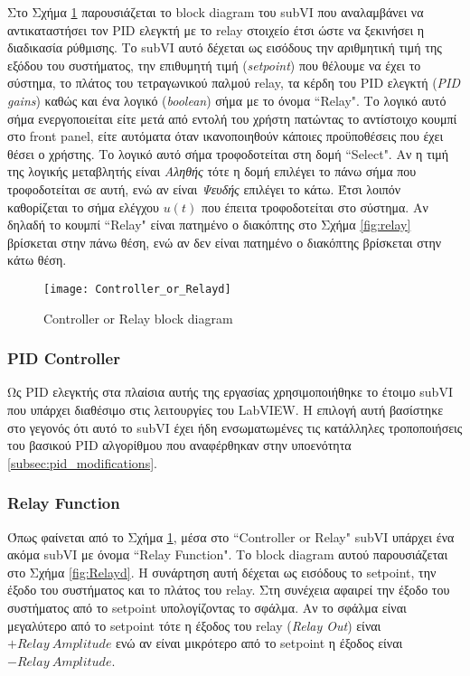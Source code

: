 Στο Σχήμα \ref{fig:Controller_or_Relayd} παρουσιάζεται το block diagram του subVI που αναλαμβάνει να αντικαταστήσει τον PID ελεγκτή με το relay στοιχείο έτσι ώστε να ξεκινήσει η διαδικασία ρύθμισης. Το subVI αυτό δέχεται ως εισόδους την αριθμητική τιμή της εξόδου του συστήματος, την επιθυμητή τιμή (\emph{setpoint}) που θέλουμε να έχει το σύστημα, το πλάτος του τετραγωνικού παλμού relay, τα κέρδη του PID ελεγκτή (\emph{PID gains}) καθώς και ένα λογικό (\emph{boolean}) σήμα με το όνομα ``Relay". Το λογικό αυτό σήμα ενεργοποιείται είτε μετά από εντολή του χρήστη πατώντας το αντίστοιχο κουμπί στο front panel, είτε αυτόματα όταν ικανοποιηθούν κάποιες προϋποθέσεις που έχει θέσει ο χρήστης. Το λογικό αυτό σήμα τροφοδοτείται στη δομή ``Select". Αν η τιμή της λογικής μεταβλητής είναι \textit{Αληθής} τότε η δομή επιλέγει το πάνω σήμα που τροφοδοτείται σε αυτή, ενώ αν είναι \textit{Ψευδής} επιλέγει το κάτω. Έτσι λοιπόν καθορίζεται το σήμα ελέγχου $u(t)$ που έπειτα τροφοδοτείται στο σύστημα. Αν δηλαδή το κουμπί ``Relay" είναι πατημένο ο διακόπτης στο Σχήμα \ref{fig:relay} βρίσκεται στην πάνω θέση, ενώ αν δεν είναι πατημένο ο διακόπτης βρίσκεται στην κάτω θέση.

\begin{figure}[h]
  \centering
  \texttt{[image: Controller\_or\_Relayd]}
  \caption{Controller or Relay block diagram}
  \label{fig:Controller_or_Relayd}
\end{figure}

\subsubsection{PID Controller}

Ως PID ελεγκτής στα πλαίσια αυτής της εργασίας χρησιμοποιήθηκε το έτοιμο subVI που υπάρχει διαθέσιμο στις λειτουργίες του LabVIEW. Η επιλογή αυτή βασίστηκε στο γεγονός ότι αυτό το subVI έχει ήδη ενσωματωμένες τις κατάλληλες τροποποιήσεις του βασικού PID αλγορίθμου που αναφέρθηκαν στην υποενότητα \ref{subsec:pid_modifications}.

\subsubsection{Relay Function}

Όπως φαίνεται από το Σχήμα \ref{fig:Controller_or_Relayd}, μέσα στο ``Controller or Relay" subVI υπάρχει ένα ακόμα subVI με όνομα ``Relay Function". Το block diagram αυτού παρουσιάζεται στο Σχήμα \ref{fig:Relayd}. Η συνάρτηση αυτή δέχεται ως εισόδους το setpoint, την έξοδο του συστήματος και το πλάτος του relay. Στη συνέχεια αφαιρεί την έξοδο του συστήματος από το setpoint υπολογίζοντας το σφάλμα. Αν το σφάλμα είναι μεγαλύτερο από το setpoint τότε η έξοδος του relay (\emph{Relay Out}) είναι $+Relay \ Amplitude$ ενώ αν είναι μικρότερο από το setpoint η έξοδος είναι $-Relay \ Amplitude$.

